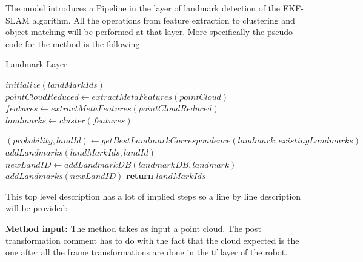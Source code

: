 \documentclass[twoside,hidelinks]{article}
\begin{document}
The model introduces a Pipeline in the layer of landmark detection of the EKF-SLAM algorithm. All the operations from feature extraction to clustering and object matching will be performed at that layer. More specifically the pseudo-code for the method is the following:

\begin{algorithm}
  \caption{Landmark Layer}\label{euclid}
  \begin{algorithmic}[1]
      \State $initialize(landMarkIds)$ 
      \State $pointCloudReduced \gets extractMetaFeatures(pointCloud)$ 
      \State $features \gets extractMetaFeatures(pointCloudReduced)$
      \State $landmarks \gets cluster(features)$  

	      \State $ (probability, landId) \gets getBestLandmarkCorrespondence(landmark, existingLandmarks) $
			   \State $ addLandmarks(landMarkIds, landId)$
			\Else 
			   \State $ newLandID \gets addLandmarkDB(landmarkDB, landmark)$ 
			   \State $addLandmarks(newLandID)$ 	   
			\EndIf
      \EndFor
      \State \textbf{return} $ landMarkIds$
    \EndProcedure
  \end{algorithmic}
\end{algorithm}


This top level description has a lot of implied steps so a line by line description will be provided:

\textbf{Method input:} The method takes as input a point cloud. The post transformation comment has to do with the fact that the 
cloud expected is the one after all the frame transformations are done in the tf layer of the robot.
\end{document}
